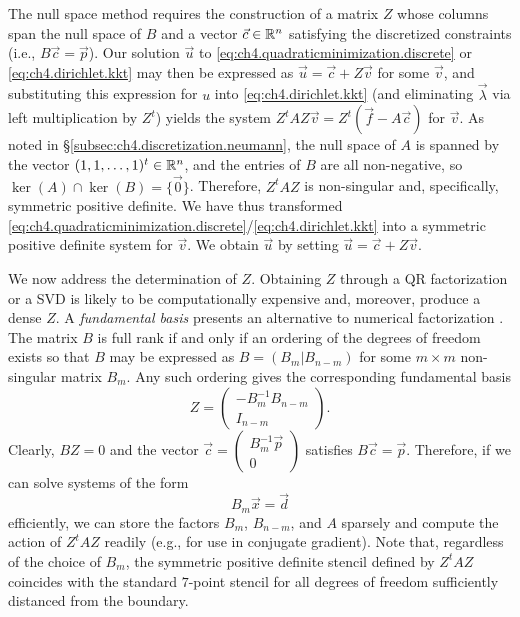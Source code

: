 The null space method requires the construction of a matrix $Z$ whose columns span the null space of $B$ and a vector $\vec{c} \in \mathbb{R}^n$ satisfying the discretized constraints (i.e., $B \vec{c} = \vec{p}$). Our solution $\vec{u}$ to \eqref{eq:ch4.quadraticminimization.discrete} or \eqref{eq:ch4.dirichlet.kkt} may then be expressed as $\vec{u} = \vec{c} + Z \vec{v}$ for some $\vec{v}$, and substituting this expression for $u$ into \eqref{eq:ch4.dirichlet.kkt} (and eliminating $\vec{\lambda}$ via left multiplication by $Z^t$) yields the system $Z^tAZ \vec{v} = Z^t (\vec{f} - A \vec{c})$ for $\vec{v}$. As noted in \S\ref{subsec:ch4.discretization.neumann}, the null space of $A$ is spanned by the vector $(1, 1, \dotsc, 1)^t \in \mathbb{R}^n$, and the entries of $B$ are all non-negative, so $\ker(A) \cap \ker(B) = \{\vec{0}\}$. Therefore, $Z^tAZ$ is non-singular and, specifically, symmetric positive definite. We have thus transformed \eqref{eq:ch4.quadraticminimization.discrete}/\eqref{eq:ch4.dirichlet.kkt} into a symmetric positive definite system for $\vec{v}$. We obtain $\vec{u}$ by setting $\vec{u} = \vec{c} + Z \vec{v}$.

We now address the determination of $Z$. Obtaining $Z$ through a QR factorization or a SVD is likely to be computationally expensive and, moreover, produce a dense $Z$. A \emph{fundamental basis} presents an alternative to numerical factorization \cite{Benzi05}. The matrix $B$ is full rank if and only if an ordering of the degrees of freedom exists so that $B$ may be expressed as $B = (B_m | B_{n-m})$ for some $m \times m$ non-singular matrix $B_m$. Any such ordering gives the corresponding fundamental basis
\begin{equation} \label{eq:ch4.fundamentalbasis}
Z = \begin{pmatrix} -B_m^{-1} B_{n-m} \\ I_{n-m} \end{pmatrix}.
\end{equation}
Clearly, $BZ = 0$ and the vector $\vec{c} = \begin{pmatrix} B_m^{-1} \vec{p} \\ 0 \end{pmatrix}$ satisfies $B \vec{c} = \vec{p}$. Therefore, if we can solve systems of the form
\begin{equation} \label{eq:ch4.bmsystem}
B_m \vec{x} = \vec{d}
\end{equation}
efficiently, we can store the factors $B_m$, $B_{n-m}$, and $A$ sparsely and compute the action of $Z^tAZ$ readily (e.g., for use in conjugate gradient). Note that, regardless of the choice of $B_m$, the symmetric positive definite stencil defined by $Z^tAZ$ coincides with the standard $7$-point stencil for all degrees of freedom sufficiently distanced from the boundary.

